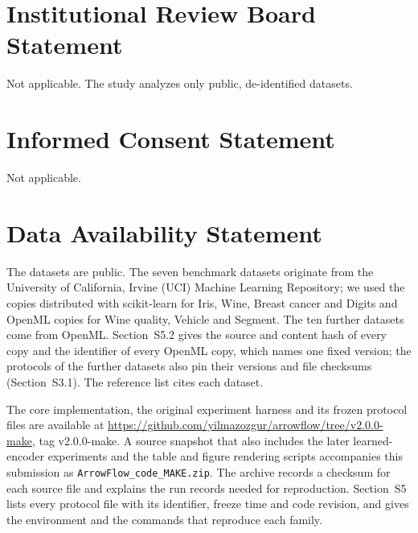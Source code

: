 \documentclass[12pt]{article}
\begin{document}
\section*{Institutional Review Board Statement}
Not applicable. The study analyzes only public, de-identified datasets.

\section*{Informed Consent Statement}
Not applicable.

\section*{Data Availability Statement}

The datasets are public. The seven benchmark datasets originate from the University of California, Irvine (UCI) Machine Learning Repository; we used the copies distributed with scikit-learn for Iris, Wine, Breast cancer and Digits and OpenML copies for Wine quality, Vehicle and Segment. The ten further datasets come from OpenML. Section~S5.2 gives the source and content hash of every copy and the identifier of every OpenML copy, which names one fixed version; the protocols of the further datasets also pin their versions and file checksums (Section~S3.1). The reference list cites each dataset.

The core implementation, the original experiment harness and its frozen protocol files are available at \url{https://github.com/yilmazozgur/arrowflow/tree/v2.0.0-make}, tag \mbox{v2.0.0-make}. A source snapshot that also includes the later learned-encoder experiments and the table and figure rendering scripts accompanies this submission as \nolinkurl{ArrowFlow_code_MAKE.zip}. The archive records a checksum for each source file and explains the run records needed for reproduction. Section~S5 lists every protocol file with its identifier, freeze time and code revision, and gives the environment and the commands that reproduce each family.
\end{document}
